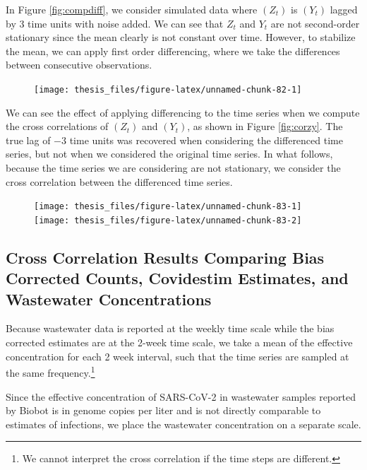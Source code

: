\documentclass[12pt,twoside]{smiththesis}
\begin{document}
In Figure \ref{fig:compdiff}, we consider simulated data where \((Z_t)\) is \((Y_t)\) lagged by 3 time units with noise added. We can see that \(Z_t\) and \(Y_t\) are not second-order stationary since the mean clearly is not constant over time. However, to stabilize the mean, we can apply first order differencing, where we take the differences between consecutive observations.
\begin{figure}
\texttt{[image: thesis\_files/figure-latex/unnamed-chunk-82-1]} \caption{\label{fig:compdiff}}\label{fig:unnamed-chunk-82}
\end{figure}
We can see the effect of applying differencing to the time series when we compute the cross correlations of \((Z_t)\) and \((Y_t)\), as shown in Figure \ref{fig:corzy}. The true lag of \(-3\) time units was recovered when considering the differenced time series, but not when we considered the original time series. In what follows, because the time series we are considering are not stationary, we consider the cross correlation between the differenced time series.
\vspace{5 cm}
\begin{figure}
\texttt{[image: thesis\_files/figure-latex/unnamed-chunk-83-1]} \texttt{[image: thesis\_files/figure-latex/unnamed-chunk-83-2]} \caption{\label{fig:corzy}}\label{fig:unnamed-chunk-83}
\end{figure}
\hypertarget{cross-correlation-results-comparing-bias-corrected-counts-covidestim-estimates-and-wastewater-concentrations}{%
\subsection{Cross Correlation Results Comparing Bias Corrected Counts, Covidestim Estimates, and Wastewater Concentrations}\label{cross-correlation-results-comparing-bias-corrected-counts-covidestim-estimates-and-wastewater-concentrations}}

Because wastewater data is reported at the weekly time scale while the bias corrected estimates are at the 2-week time scale, we take a mean of the effective concentration for each 2 week interval, such that the time series are sampled at the same frequency.\footnote{We cannot interpret the cross correlation if the time steps are different.}

Since the effective concentration of SARS-CoV-2 in wastewater samples reported by Biobot is in genome copies per liter and is not directly comparable to estimates of infections, we place the wastewater concentration on a separate scale.
\end{document}

